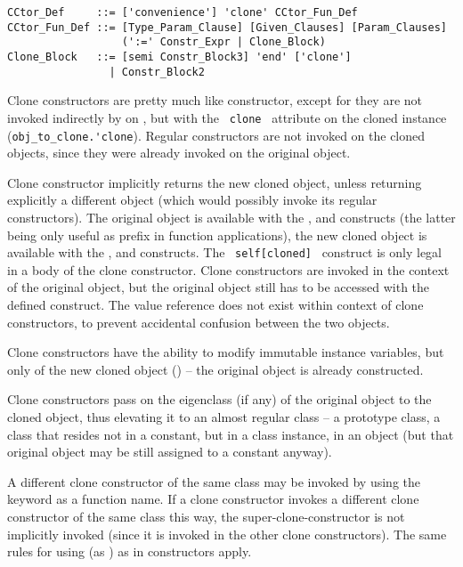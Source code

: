 \grammar\begin{lstlisting}
CCtor_Def     ::= ['convenience'] 'clone' CCtor_Fun_Def
CCtor_Fun_Def ::= [Type_Param_Clause] [Given_Clauses] [Param_Clauses] 
                  (':=' Constr_Expr | Clone_Block)
Clone_Block   ::= [semi Constr_Block3] 'end' ['clone']
                | Constr_Block2
\end{lstlisting}

Clone constructors are pretty much like constructor, except for they are not invoked indirectly by  on , but with the ~\lstinline[deletekeywords={clone}]!clone!~ attribute on the cloned instance (\lstinline[deletekeywords={clone}]!obj_to_clone.'clone!). Regular constructors are not invoked on the cloned objects, since they were already invoked on the original object. 

Clone constructor implicitly returns the new cloned object, unless returning explicitly a different object (which would possibly invoke its regular constructors). The original object is available with the ,  and  constructs (the latter being only useful as prefix in function applications), the new cloned object is available with the ,  and  constructs. The ~\lstinline!self[cloned]!~ construct is only legal in a body of the clone constructor. Clone constructors are invoked in the context of the original object, but the original object still has to be accessed with the defined construct. The  value reference does not exist within context of clone constructors, to prevent accidental confusion between the two objects. 

Clone constructors have the ability to modify immutable instance variables, but only of the new cloned object () -- the original object is already constructed. 

Clone constructors pass on the eigenclass (if any) of the original object to the cloned object, thus elevating it to an almost regular class -- a prototype class, a class that resides not in a constant, but in a class instance, in an object (but that original object may be still assigned to a constant anyway). 

A different clone constructor of the same class may be invoked by using the  keyword as a function name. If a clone constructor invokes a different clone constructor of the same class this way, the super-clone-constructor is not implicitly invoked (since it is invoked in the other clone constructors). The same rules for using  (as ) as in constructors apply. 

